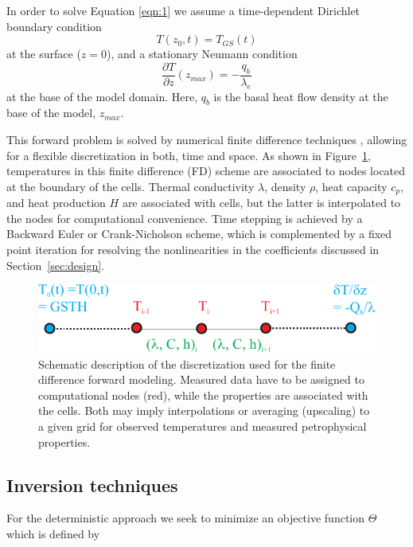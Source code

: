 \documentclass[cp]{copernicus}
\begin{document}
In order to solve Equation \ref{eqn:1} we assume a time-dependent Dirichlet boundary condition 
\begin{equation}\label{eqn:3a} 
T(z_0,t)=T_{GS}(t)
\end{equation} 
\noindent at the surface ($z=0$), and a stationary Neumann condition
\begin{equation}\label{eqn:3b}
\frac{\partial T}{\partial z}(z_{max }) = - \frac{q_b}{\lambda_e}
\end{equation} 
\noindent at the base of the model domain. Here, $q_b$ is the basal heat flow density at the base 
 of the model, $z_{max}$. 
 
This forward problem is solved by numerical finite difference techniques \cite[e.g.,][] 
{Patankar1980a}, allowing for a flexible discretization in both, time and space. As shown in 
Figure~\ref{fig:FD}, temperatures in this finite difference (FD) scheme are associated to nodes 
located at the boundary of the cells. Thermal conductivity $\lambda$, density $\rho$, heat capacity 
$c_p$, and heat production $H$ are associated with cells, but the latter is interpolated to the 
nodes for computational convenience. Time stepping is achieved by a Backward Euler or 
Crank-Nicholson scheme, which is complemented by a fixed point iteration for resolving the 
nonlinearities in the coefficients discussed in Section~\ref{sec:design}.


\begin{figure}[htp]
 \centering
 \includegraphics[width=\columnwidth]{Figures/FDScheme}
 \caption[Schematic description of the finite difference discretization.]{Schematic description of 
the discretization used for the finite difference forward modeling. Measured data have to be 
assigned to computational nodes (red), while the properties are associated with the cells. Both may 
imply interpolations or averaging (upscaling) to a given grid for observed temperatures and 
measured 
petrophysical properties.}
\label{fig:FD}
\end{figure}

\subsection{Inversion techniques}
\label{sec:tinv}
For the deterministic approach we seek to minimize an objective function $\Theta$ which is defined 
by
\end{document}

